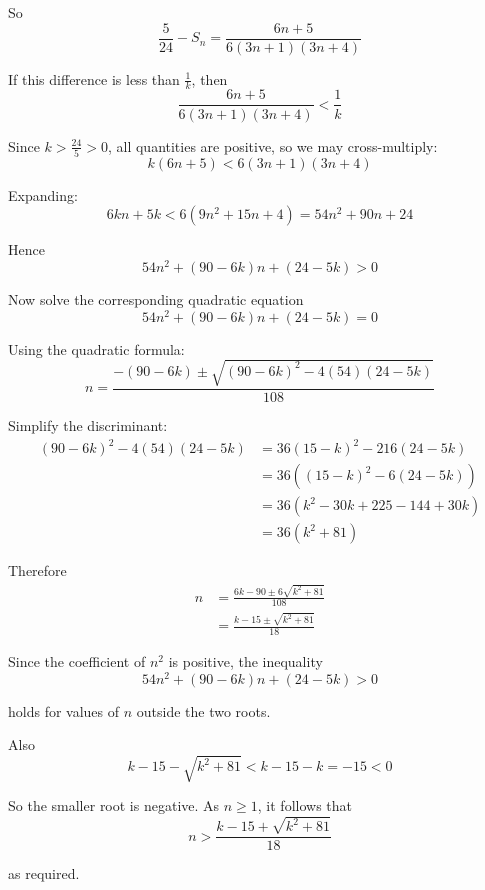 \documentclass[leqno]{article}
\begin{document}
\begin{enumerate}[
  label=\textbf{\arabic*.},
  leftmargin=*,
  topsep=0pt,
  partopsep=0pt,
  parsep=0pt
]
\begin{djsSolution}
\begin{enumerate}[label=\textbf{(\alph*)}]
So
\[
\frac5{24}-S_n=\frac{6n+5}{6(3n+1)(3n+4)}
\]

If this difference is less than \(\frac1k\), then
\[
\frac{6n+5}{6(3n+1)(3n+4)}<\frac1k
\]

Since \(k>\frac{24}{5}>0\), all quantities are positive, so we may cross-multiply:
\[
k(6n+5)<6(3n+1)(3n+4)
\]

Expanding:
\[
6kn+5k<6(9n^2+15n+4)=54n^2+90n+24
\]

Hence
\[
54n^2+(90-6k)n+(24-5k)>0
\]

Now solve the corresponding quadratic equation
\[
54n^2+(90-6k)n+(24-5k)=0
\]

Using the quadratic formula:
\[
n=\frac{-(90-6k)\pm\sqrt{(90-6k)^2-4(54)(24-5k)}}{108}
\]

Simplify the discriminant:
\begin{align*}
(90-6k)^2-4(54)(24-5k)
&=36(15-k)^2-216(24-5k) \\
&=36\left((15-k)^2-6(24-5k)\right) \\
&=36\left(k^2-30k+225-144+30k\right) \\
&=36(k^2+81)
\end{align*}

Therefore
\begin{align*}
n
&=\frac{6k-90\pm 6\sqrt{k^2+81}}{108} \\
&=\frac{k-15\pm\sqrt{k^2+81}}{18}
\end{align*}

Since the coefficient of \(n^2\) is positive, the inequality
\[
54n^2+(90-6k)n+(24-5k)>0
\]

holds for values of \(n\) outside the two roots.

Also
\[
k-15-\sqrt{k^2+81}<k-15-k=-15<0
\]

So the smaller root is negative. As \(n\geq 1\), it follows that
\[
n>\frac{k-15+\sqrt{k^2+81}}{18}
\]

as required.
\end{enumerate}
\end{djsSolution}


\end{enumerate}
\end{document}
